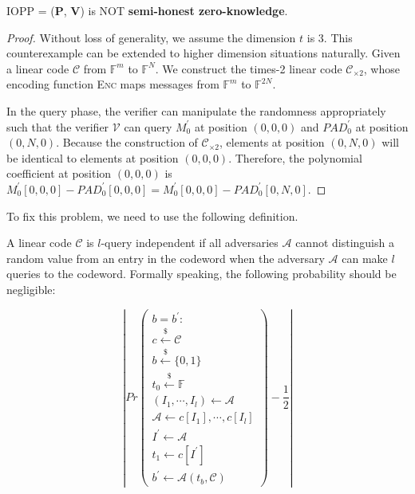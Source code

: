 \begin{lemma}
\label{lemma:szkpc-zk-cexample}

IOPP = ($\textbf{P}$, $\textbf{V}$) is NOT \textbf{semi-honest zero-knowledge}.

\end{lemma}
\begin{proof}

Without loss of generality, we assume the dimension $t$ is 3. This counterexample can be extended to higher dimension situations naturally. Given a linear code $\mathcal{C}$ from $\mathbb{F}^m$ to $\mathbb{F}^N$. We construct the times-2 linear code $\mathcal{C}_{\times 2}$, whose encoding function \textsc{Enc} maps messages from $\mathbb{F}^m$ to $\mathbb{F}^{2N}$.

In the query phase, the verifier can manipulate the randomness appropriately such that the verifier $\mathcal{V}$ can query $M_0^\prime$ at position $(0, 0, 0)$ and $PAD_0^\prime$ at position $(0, N, 0)$.
Because the construction of $\mathcal{C}_{\times 2}$, elements at position $(0, N, 0)$ will be identical to elements at position $(0, 0, 0)$. 
Therefore, the polynomial coefficient at position $(0, 0, 0)$ is $M_0^\prime[0, 0, 0] - PAD_0^\prime[0, 0, 0] = M_0^\prime[0, 0, 0] - PAD_0^\prime[0, N, 0]$.
\end{proof}









To fix this problem, we need to use the following definition.

\begin{definition}
A linear code $\mathcal{C}$ is $l$-query independent if all adversaries $\mathcal{A}$ cannot distinguish a random value from an entry in the codeword when the adversary $\mathcal{A}$ can make $l$ queries to the codeword. Formally speaking, the following probability should be negligible:


$$
\left \lvert
Pr
\begin{pmatrix}
 b = b^\prime : \\
 c \overset{{\scriptscriptstyle\$}}{\leftarrow} \mathcal{C} \\
 b \overset{{\scriptscriptstyle\$}}{\leftarrow} \{0, 1\} \\
 t_0 \overset{{\scriptscriptstyle\$}}{\leftarrow} \mathbb{F} \\
 (I_1, \cdots, I_l) \leftarrow \mathcal{A} \\
 \mathcal{A} \leftarrow c[I_1], \cdots, c[I_l] \\
 I^\prime \leftarrow \mathcal{A} \\
 t_1 \leftarrow c[I^\prime] \\
 b^\prime \leftarrow \mathcal{A}(t_b, \mathcal{C})
\end{pmatrix}
- \frac{1}{2}
\right \rvert
$$
\end{definition}

